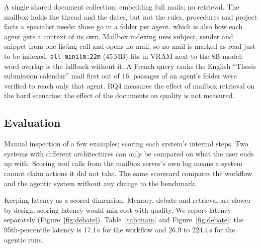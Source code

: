 \documentclass[11pt,a4paper]{article}
\newcommand{\code}[1]{\texttt{#1}}
\begin{document}
{A single shared document collection; embedding full mails; no retrieval.}
{The mailbox holds the thread and the dates, but not the rules, procedures and project facts a specialist needs: those
go in a folder per agent, which is also how each agent gets a context of its own. Mailbox indexing uses subject, sender
and snippet from one listing call and opens no mail, so no mail is marked as read just to be indexed.
\code{all-minilm:22m} (45\,MB) fits in VRAM next to the 8B model; word overlap is the fallback without it.}
{A French query ranks the English ``Thesis submission calendar'' mail first out of 16; passages of an agent's folder
were verified to reach only that agent. RQ4 measures the effect of mailbox retrieval on the hard scenarios; the effect
of the documents on quality is not measured.}

\subsection{Evaluation}
{Manual inspection of a few examples; scoring each system's internal steps.}
{Two systems with different architectures can only be compared on what the user ends up with. Scoring tool calls
from the mailbox server's own log means a system cannot claim actions it did not take.}
{The same scorecard compares the workflow and the agentic system without any change to the benchmark.}

{Keeping latency as a scored dimension.}
{Memory, debate and retrieval are slower by design; scoring latency would mix cost with quality. We report latency
separately (Figure~\ref{fig:debate}).}
{Table~\ref{tab:main} and Figure~\ref{fig:debate}: the 95th-percentile latency is 17.1\,s for the workflow and 26.9 to 224.4\,s for the agentic runs.}
\end{document}

